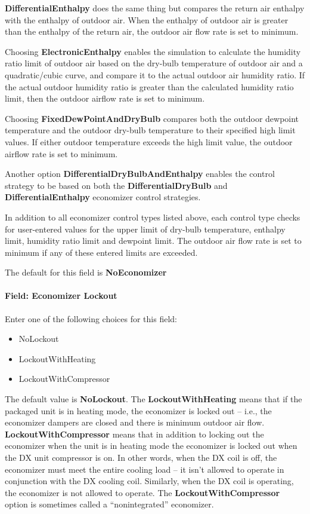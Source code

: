 \textbf{DifferentialEnthalpy} does the same thing but compares the return air enthalpy with the enthalpy of outdoor air. When the enthalpy of outdoor air is greater than the enthalpy of the return air, the outdoor air flow rate is set to minimum.

Choosing \textbf{ElectronicEnthalpy} enables the simulation to calculate the humidity ratio limit of outdoor air based on the dry-bulb temperature of outdoor air and a quadratic/cubic curve, and compare it to the actual outdoor air humidity ratio. If the actual outdoor humidity ratio is greater than the calculated humidity ratio limit, then the outdoor airflow rate is set to minimum.

Choosing \textbf{FixedDewPointAndDryBulb} compares both the outdoor dewpoint temperature and the outdoor dry-bulb temperature to their specified high limit values. If either outdoor temperature exceeds the high limit value, the outdoor airflow rate is set to minimum.

Another option \textbf{DifferentialDryBulbAndEnthalpy} enables the control strategy to be based on both the \textbf{DifferentialDryBulb} and \textbf{DifferentialEnthalpy} economizer control strategies.

In addition to all economizer control types listed above, each control type checks for user-entered values for the upper limit of dry-bulb temperature, enthalpy limit, humidity ratio limit and dewpoint limit. The outdoor air flow rate is set to minimum if any of these entered limits are exceeded.

The default for this field is \textbf{NoEconomizer}

\paragraph{Field: Economizer Lockout}\label{field-economizer-lockout-1-000}

Enter one of the following choices for this field:

\begin{itemize}
\item
  NoLockout
\item
  LockoutWithHeating
\item
  LockoutWithCompressor
\end{itemize}

The default value is \textbf{NoLockout}. The \textbf{LockoutWithHeating} means that if the packaged unit is in heating mode, the economizer is locked out -- i.e., the economizer dampers are closed and there is minimum outdoor air flow. \textbf{LockoutWithCompressor} means that in addition to locking out the economizer when the unit is in heating mode the economizer is locked out when the DX unit compressor is on. In other words, when the DX coil is off, the economizer must meet the entire cooling load -- it isn't allowed to operate in conjunction with the DX cooling coil. Similarly, when the DX coil is operating, the economizer is not allowed to operate. The \textbf{LockoutWithCompressor} option is sometimes called a ``nonintegrated'' economizer.

